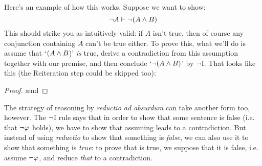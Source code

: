 


Here's an example of how this works.  Suppose we want to show:
$$\neg A \vdash \neg(A \wedge B)$$
This should strike you as intuitively valid: if $A$ isn't true, then of course any conjunction containing $A$ can't be true either.  To prove this, what we'll do is assume that `$(A \wedge B$)' \emph{is} true, derive a contradiction from this assumption together with our premise, and then conclude `$\neg (A \wedge B)$' by $\neg$I.  That looks like this (the Reiteration step could be skipped too):
\begin{proof}
	 
	\open
	 
	\ae{nd}
	\close
\end{proof}

The strategy of reasoning by \emph{reductio ad absurdum} can take another form too, however. The $\neg$I rule says that in order to show that some sentence \meta{\varphi} is false (i.e. that $\neg \mathcal{\varphi}$ holds), we have to show that assuming \meta{\varphi} leads to a contradiction.  But instead of using \emph{reductio} to show that something is \emph{false}, we can also use it to show that something is \emph{true}: to prove that \meta{\varphi} is true, we suppose that it is false, i.e. assume $\neg \mathcal{\varphi}$, and reduce \emph{that} to a contradiction.



